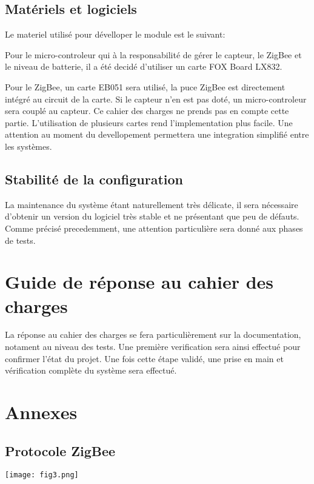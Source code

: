 \subsection{Matériels et logiciels}
Le materiel utilisé pour dévelloper le module est le suivant:

Pour le micro-controleur qui à la responsabilité de gérer le capteur, le ZigBee et le niveau de batterie, il a été decidé d'utiliser un carte FOX Board LX832.

Pour le ZigBee, un carte EB051 sera utilisé, la puce ZigBee est directement intégré au circuit de la carte. 
Si le capteur n'en est pas doté, un micro-controleur sera couplé au capteur. Ce cahier des charges ne prends pas en compte cette partie.
L'utilisation de plusieurs cartes rend l'implementation plus facile. Une attention au moment du devellopement permettera une integration simplifié entre les systèmes.

\subsection{Stabilité de la configuration}

La maintenance du système étant naturellement très délicate, il sera nécessaire d'obtenir un version du logiciel très stable et ne présentant que peu de défauts. Comme précisé precedemment, une attention particulière sera donné aux phases de tests.

\section{Guide de réponse au cahier des charges}
La réponse au cahier des charges se fera particulièrement sur la documentation, notament au niveau des tests. Une première verification sera ainsi effectué pour confirmer l'état du projet. Une fois cette étape validé, une prise en main et vérification complète du système sera effectué.

\section{Annexes}
\subsection{Protocole ZigBee}

\texttt{[image: fig3.png]}


